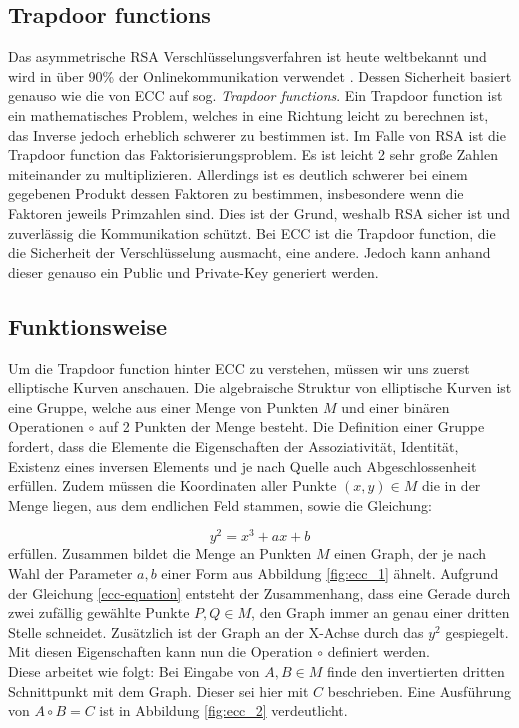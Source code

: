 \documentclass{scrreprt}
\begin{document}
\subsection{Trapdoor functions}
Das asymmetrische RSA Verschlüsselungsverfahren ist heute weltbekannt und wird in über 90\% der Onlinekommunikation verwendet \cite{ecc-rsa_amount}. Dessen Sicherheit basiert genauso wie die von ECC auf sog.  \textit{Trapdoor functions}. Ein Trapdoor function ist ein mathematisches Problem, welches in eine Richtung leicht zu berechnen ist, das Inverse jedoch erheblich schwerer zu bestimmen ist. Im Falle von RSA ist die Trapdoor function das Faktorisierungsproblem. Es ist leicht 2 sehr große Zahlen miteinander zu multiplizieren. Allerdings ist es deutlich schwerer bei einem gegebenen Produkt dessen Faktoren zu bestimmen, insbesondere wenn die Faktoren jeweils Primzahlen sind. Dies ist der Grund, weshalb RSA sicher ist und zuverlässig die Kommunikation schützt. Bei ECC ist die Trapdoor function, die die Sicherheit der Verschlüsselung ausmacht, eine andere. Jedoch kann anhand dieser genauso ein Public und Private-Key generiert werden.
\subsection{Funktionsweise}
Um die Trapdoor function hinter ECC zu verstehen, müssen wir uns zuerst elliptische Kurven anschauen. Die algebraische Struktur von elliptische Kurven ist eine Gruppe, welche aus einer Menge von Punkten $M$ und einer binären Operationen $\circ$ auf 2 Punkten der Menge besteht. Die Definition einer Gruppe fordert, dass die Elemente die Eigenschaften der Assoziativität, Identität, Existenz eines inversen Elements und je nach Quelle auch Abgeschlossenheit erfüllen. \cite{ecc-aradi2016einfuhrung}\cite{ecc-bogopolskij2008introduction} Zudem müssen die Koordinaten aller Punkte $(x,y) \in M$ die in der Menge liegen, aus dem endlichen Feld stammen, sowie die Gleichung:

\begin{equation}
    \label{ecc-equation}
    y^2 = x^3+ax+b
\end{equation} erfüllen. Zusammen bildet die Menge an Punkten $M$ einen Graph, der je nach Wahl der Parameter $a,b$ einer Form aus Abbildung \ref{fig:ecc_1} ähnelt. Aufgrund der Gleichung \ref{ecc-equation} entsteht der Zusammenhang, dass eine Gerade durch zwei zufällig gewählte Punkte $P,Q \in M$, den Graph immer an genau einer dritten Stelle schneidet. Zusätzlich ist der Graph an der X-Achse durch das $y^2$ gespiegelt. Mit diesen Eigenschaften kann nun die Operation $\circ$ definiert werden.\\
Diese arbeitet wie folgt: Bei Eingabe von $A,B \in M$ finde den invertierten dritten Schnittpunkt mit dem Graph. Dieser sei hier mit $C$ beschrieben. Eine Ausführung von $A \circ B = C$ ist in Abbildung \ref{fig:ecc_2} verdeutlicht.
\end{document}
